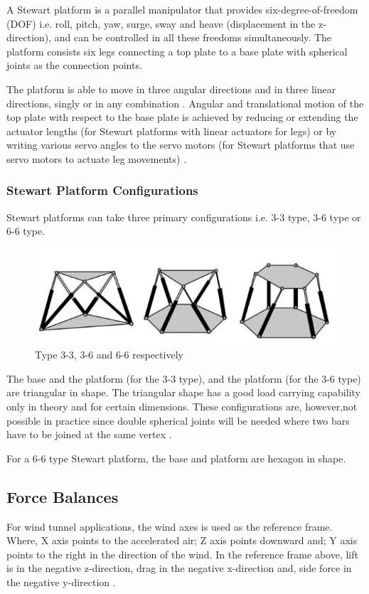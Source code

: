 A Stewart platform is a parallel manipulator that provides six-degree-of-freedom (DOF) i.e. roll, pitch, yaw, surge, sway and heave (displacement in the z-direction), and can be controlled in all these freedoms simultaneously.
The platform consists six legs connecting a top plate to a base plate with spherical joints as the connection points.

The platform is able to move in three angular directions and in three linear directions, singly or in any combination \cite{stewart1965platform}. Angular and translational motion of the top plate with
respect to the base plate is achieved by reducing or extending the actuator lengths (for Stewart platforms with linear actuators for legs) or by writing various servo angles to the servo motors
(for Stewart platforms that use servo motors to actuate leg movements) \cite{iqbal_dynamic_2008}.

\subsubsection{Stewart Platform Configurations}
Stewart platforms can take three primary configurations i.e. 3-3 type, 3-6 type or 6-6 type.
\begin{center}
	\begin{figure}[H]
		\centering
		\includegraphics{Figures/stewart}
		\caption[Configurations]{Type 3-3, 3-6 and 6-6 respectively
			\cite{fernandes_design_nodate}}
	\end{figure}
\end{center}
The base and the platform (for the 3-3 type), and the platform (for the 3-6 type) are triangular in shape. The triangular shape has a good load carrying capability only in theory and for certain dimensions. These configurations are, however,not possible in practice since double spherical joints will be needed where two bars have to be joined at the same vertex
\cite{fernandes_design_nodate}.

For a 6-6 type Stewart platform, the base and platform are hexagon in shape.

\subsection{Force Balances}
For wind tunnel applications, the wind axes is used as the reference frame. Where, X axis points to the accelerated air; Z axis points downward and; Y axis points to the right in the direction of the wind. In the reference frame above, lift is in the negative z-direction, drag in the negative x-direction and, side force in the negative y-direction \cite{bueno2018design}.

